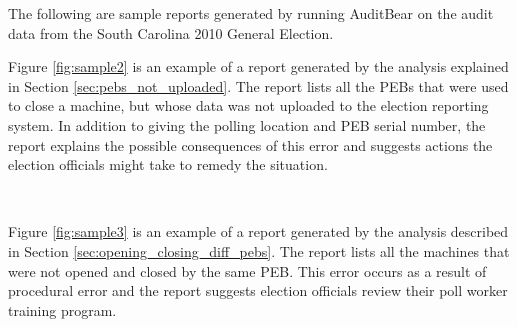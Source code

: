 \smvertspace

The following are sample reports generated by running AuditBear on the
audit data from the South Carolina 2010 General Election. 

Figure
\ref{fig:sample2} is an example of a report generated by the analysis
explained in Section \ref{sec:pebs_not_uploaded}. The report lists all
the PEBs that were used to close a machine, but whose data was not
uploaded to the election reporting 
system. In addition to giving the polling location and PEB serial
number, the report explains the possible consequences of this
error and suggests actions the election officials might take to
remedy the situation.
\begin{figure}[h]
\centering
\mbox{
}
\end{figure}

Figure \ref{fig:sample3} is an example of a report generated by the
analysis described in Section \ref{sec:opening_closing_diff_pebs}. The
report lists all the machines that were not opened and closed by the
same PEB. This error occurs as a result of procedural error and the
report suggests election officials review their poll worker training
program.



